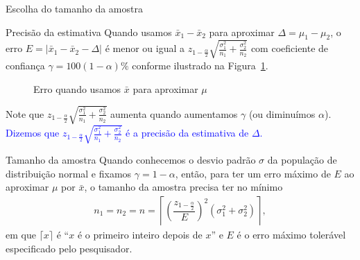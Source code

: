 \documentclass[9pt]{beamer}
\begin{document}
\begin{frame}{Escolha do tamanho da amostra}

\tiny

\begin{block}{Precisão da estimativa}
	Quando usamos $\bar{x}_1 -\bar{x}_2$ para aproximar $\Delta=\mu_1-\mu_2$, o erro $E = \lvert \bar{x}_1 -\bar{x}_2 - \Delta \rvert$ é menor ou igual a $z_{1-\frac{\alpha}{2}} \sqrt{ \frac{\sigma_1^2}{n_1} + \frac{\sigma_2^2}{n_2} }$ com coeficiente de confiança $\gamma = 100(1-\alpha)\%$ conforme  ilustrado na Figura~\ref{fig:intervalo_conf}.
	
	\begin{figure}
		\centering
		\caption{Erro quando usamos $\bar{x}$ para aproximar $\mu$}
		\label{fig:intervalo_conf}
	\end{figure}
	Note que $z_{1-\frac{\alpha}{2}} \sqrt{ \frac{\sigma_1^2}{n_1} + \frac{\sigma_2^2}{n_2} }$ aumenta quando aumentamos $\gamma$ (ou diminuímos $\alpha$).  \textcolor{blue}{Dizemos que $z_{1-\frac{\alpha}{2}} \sqrt{ \frac{\sigma_1^2}{n_1} + \frac{\sigma_2^2}{n_2} }$ é a precisão da estimativa de $\Delta$.}
\end{block}

\begin{block}{Tamanho da amostra}
	Quando conhecemos o desvio padrão $\sigma$ da população de distribuição normal e fixamos $\gamma=1-\alpha$, então, para ter um erro máximo de $E$ ao aproximar $\mu$ por $\bar{x}$, o tamanho da amostra precisa ter no mínimo 
	\begin{align*}
	n_1=n_2=n = \left\lceil \left( \dfrac{z_{1-\frac{\alpha}{2}}}{E} \right)^2 (\sigma_1^2 + \sigma_2^2) \right\rceil,
	\end{align*}
	em que $\lceil x \rceil$ é ``$x$ é o primeiro inteiro depois de $x$'' e $E$ é o erro máximo tolerável especificado pelo pesquisador.
\end{block}

\normalsize
\end{frame}
\end{document}
